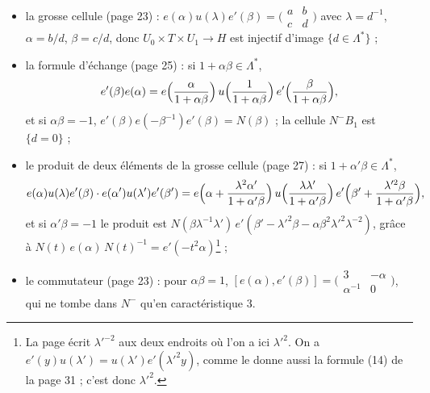 \documentclass[11pt,a4paper]{article}
\begin{document}
\begin{itemize}
  \item la grosse cellule (page 23) : $e(\alpha)u(\lambda)e'(\beta) =
    \bigl(\begin{smallmatrix} a & b \\ c & d\end{smallmatrix}\bigr)$ avec
    $\lambda = d^{-1}$, $\alpha = b/d$, $\beta = c/d$, donc $U_0 \times T
    \times U_1 \to H$ est injectif d'image $\{d \in \Lambda^{*}\}$ ;
  \item la formule d'échange (page 25) : si $1 + \alpha\beta \in \Lambda^{*}$,
    \[
      e'(\beta)e(\alpha) = e\Bigl(\frac{\alpha}{1+\alpha\beta}\Bigr)\,
      u\Bigl(\frac{1}{1+\alpha\beta}\Bigr)\,
      e'\Bigl(\frac{\beta}{1+\alpha\beta}\Bigr),
    \]
    et si $\alpha\beta = -1$, $e'(\beta)e(-\beta^{-1})e'(\beta) = N(\beta)$ ;
    la cellule $N^{-}B_1$ est $\{d = 0\}$ ;
  \item le produit de deux éléments de la grosse cellule (page 27) : si $1 +
    \alpha'\beta \in \Lambda^{*}$,
    \[
      e(\alpha)u(\lambda)e'(\beta)\cdot e(\alpha')u(\lambda')e'(\beta')
      = e\Bigl(\alpha + \frac{\lambda^2\alpha'}{1+\alpha'\beta}\Bigr)\,
      u\Bigl(\frac{\lambda\lambda'}{1+\alpha'\beta}\Bigr)\,
      e'\Bigl(\beta' + \frac{\lambda'^{2}\beta}{1+\alpha'\beta}\Bigr),
    \]
    et si $\alpha'\beta = -1$ le produit est $N(\beta\lambda^{-1}\lambda')\,
    e'(\beta' - \lambda'^2\beta - \alpha\beta^2\lambda'^2\lambda^{-2})$, grâce à
    $N(t)\,e(\alpha)\,N(t)^{-1} = e'(-t^2\alpha)$\footnote{La page écrit
    $\lambda'^{-2}$ aux deux endroits où l'on a ici $\lambda'^2$. On a
    $e'(y)u(\lambda') = u(\lambda')e'(\lambda'^2 y)$, comme le donne aussi la
    formule (14) de la page 31 ; c'est donc $\lambda'^2$.} ;
  \item le commutateur (page 23) : pour $\alpha\beta = 1$, $[e(\alpha),
    e'(\beta)] = \bigl(\begin{smallmatrix} 3 & -\alpha \\ \alpha^{-1} &
    0\end{smallmatrix}\bigr)$, qui ne tombe dans $N^{-}$ qu'en caractéristique
    $3$.
\end{itemize}
\end{document}
